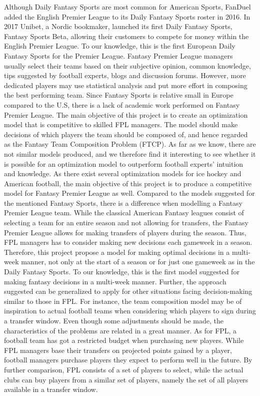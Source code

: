 \newpar
Although Daily Fantasy Sports are most common for American Sports, FanDuel added the English Premier League to its Daily Fantasy Sports roster in 2016. In 2017 Unibet, a Nordic bookmaker, launched its first Daily Fantasy Sports, Fantasy Sports Beta, allowing their customers to compete for money within the English Premier League. To our knowledge, this is the first European Daily Fantasy Sports for the Premier League. 
\newpar
Fantasy Premier League managers usually select their teams based on their subjective opinion, common knowledge, tips suggested by football experts, blogs and discussion forums. However, more dedicated players may use statistical analysis and put more effort in composing the best performing team. Since Fantasy Sports is relative small in Europe compared to the U.S, there is a lack of academic work performed on Fantasy Premier League.
\newpar
The main objective of this project is to create an optimization model that is competitive to skilled FPL managers. The model should make decisions of which players the team should be composed of, and hence regarded as the Fantasy Team Composition Problem (FTCP). As far as we know, there are not similar models produced, and we therefore find it interesting to see whether it is possible for an optimization model to outperform football experts' intuition and knowledge. 
\newpar
As there exist several optimization models for ice hockey \citep{drafting_hockey_pools} and American football\citep{Fry}, the main objective of this project is to produce a competitive model for Fantasy Premier League as well. Compared to the models suggested for the mentioned Fantasy Sports, there is a difference when modelling a Fantasy Premier League team. While the classical American Fantasy leagues consist of selecting a team for an entire season and not allowing for transfers, the Fantasy Premier League allows for making transfers of players during the season. Thus, FPL managers has to consider making new decisions each gameweek in a season. Therefore, this project propose a model for making optimal decisions in a multi-week manner, not only at the start of a season or for just one gameweek as in the Daily Fantasy Sports. To our knowledge, this is the first model suggested for making fantasy decisions in a multi-week manner.
\newpar
Further, the approach suggested can be generalized to apply for other situations facing decision-making similar to those in FPL. For instance, the team composition model may be of inspiration to actual football teams when considering which players to sign during a transfer window. Even though some adjustments should be made, the characteristics of the problems are related in a great manner. As for FPL, a football team has got a restricted budget when purchasing new players. While FPL managers base their transfers on projected points gained by a player, football managers purchase players they expect to perform well in the future. By further comparison, FPL consists of a set of players to select, while the actual clubs can buy players from a similar set of players, namely the set of all players available in a transfer window.


